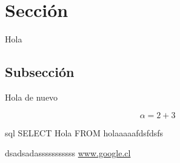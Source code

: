 
\section{Sección}

Hola

\subsection{Subsección}

Hola de nuevo

\begin{equation}
    \alpha = 2 + 3
\end{equation}

\begin{mintedcode}{sql}
    SELECT Hola
    FROM holaaaaafdsfdsfs
\end{mintedcode}




dsadsadasssssssssss \url{www.google.cl}
